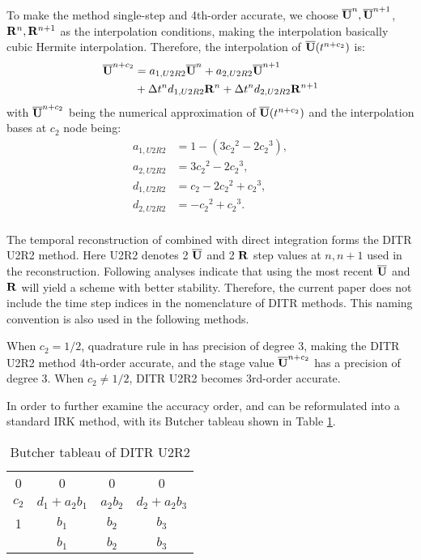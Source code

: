 To make the method single-step and 4th-order accurate,
we choose $\overline{\mathbf{U}}^{n},\overline{\mathbf{U}}^{n+1}$, $\mathbf{R}^{n},\mathbf{R}^{n+1}$ as
the interpolation conditions, making the interpolation
basically cubic Hermite interpolation.
Therefore, the interpolation of $\overline{\mathbf{U}}(t^{n+c_2})$
is:
\begin{equation}
    \begin{aligned}
        \label{eq:TRU2R2}
        \overline{\mathbf{U}}^{n+c_2} & =
        a_{1,U2R2}\overline{\mathbf{U}}^{n} +
        a_{2,U2R2}\overline{\mathbf{U}}^{n + 1}
        \\ & +
        {\Delta} t^n d_{1,U2R2}\mathbf{R}^{n} +
        {\Delta} t^n d_{2,U2R2}\mathbf{R}^{n + 1}
    \end{aligned}
\end{equation}
with $\overline{\mathbf{U}}^{n+c_2}$ being
the numerical approximation
of $\overline{\mathbf{U}}(t^{n+c_2})$
and the interpolation bases at $c_2$ node being:
\begin{equation}
    \begin{aligned}
        a_{1,U2R2} & = 1 - (3{c_2}^2 - 2 {c_2}^3) , \\
        a_{2,U2R2} & = 3{c_2}^2 - 2 {c_2}^3 ,       \\
        d_{1,U2R2} & = {c_2} - 2 {c_2}^2 + {c_2}^3, \\
        d_{2,U2R2} & = - {c_2}^2 + {c_2}^3 .        \\
    \end{aligned}
    \label{eq:interpU2R2}
\end{equation}

The temporal reconstruction of 
combined with direct integration 
forms the DITR U2R2 method.
Here U2R2 denotes 2 $\overline{\mathbf{U}}$ and 2 $\mathbf{R}$
step values at $n,n+1$ used in the reconstruction.
Following analyses indicate that using
the most recent $\overline{\mathbf{U}}$ and $\mathbf{R}$
will yield a scheme with better stability.
Therefore, the current paper does not include the
time step indices in the nomenclature of DITR methods.
This naming convention is also used in the following
methods.

When $c_2=1/2$, quadrature rule in   has precision
of degree 3, making the DITR U2R2 method 4th-order accurate,
and the stage value $\overline{\mathbf{U}}^{n+c_2}$ has a precision of degree 3.
When $c_2\neq1/2$, DITR U2R2 becomes 3rd-order accurate.

In order to further examine the accuracy order,
 and 
can be reformulated into a standard IRK method,
with its Butcher tableau shown in Table \ref{tab:U2R2Butcher}.
\begin{table}[htbp]
    \centering
    \begin{tabular}{c|ccc}
        0     & 0              & 0        & 0              \\
        $c_2$ & $d_1 + a_2b_1$ & $a_2b_2$ & $d_2 + a_2b_3$ \\
        1     & $b_1$          & $b_2$    & $b_3$          \\ \hline
              & $b_1$          & $b_2$    & $b_3$
    \end{tabular}
    \caption{Butcher tableau of DITR U2R2}
    \label{tab:U2R2Butcher}
\end{table}

